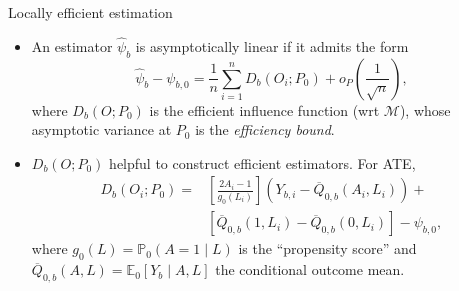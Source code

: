 \documentclass{beamer}
\begin{document}
\begin{frame}[c]{Locally efficient estimation}

\begin{center}
\begin{itemize}
  \itemsep6pt
  \item An estimator $\hat{\psi}_b$ is asymptotically linear if it admits the
    form
    $$ \hat{\psi}_b - \psi_{b,0} = \frac{1}{n} \sum_{i = 1}^{n}
      D_b(O_i; P_0) + o_P\left(\frac{1}{\sqrt{n}}\right), $$
      where $D_b(O; P_0)$ is the efficient influence function (wrt
      $\mathcal{M}$), whose asymptotic variance at $P_0$ is the
      \textit{efficiency bound}.
  \item $D_b(O; P_0)$ helpful to construct efficient estimators. For ATE,
    \begin{align*}
      D_b (O_i; P_0) =& \left[\frac{2A_i - 1}{g_0(L_i)} \right] (Y_{b, i} -
      \overline{Q}_{0,b}(A_i, L_i)) + \\ &[\overline{Q}_{0,b}(1, L_i)
      - \overline{Q}_{0,b}(0, L_i)] - \psi_{b, 0},
    \end{align*}
    where $g_0(L) = \mathbb{P}_0(A = 1 \mid L)$ is the ``propensity score''
    and $\overline{Q}_{0,b}(A,L) = \mathbb{E}_0[Y_b \mid A, L]$ the conditional
    outcome mean.
\end{itemize}
\end{center}

\end{frame}

\end{document}
